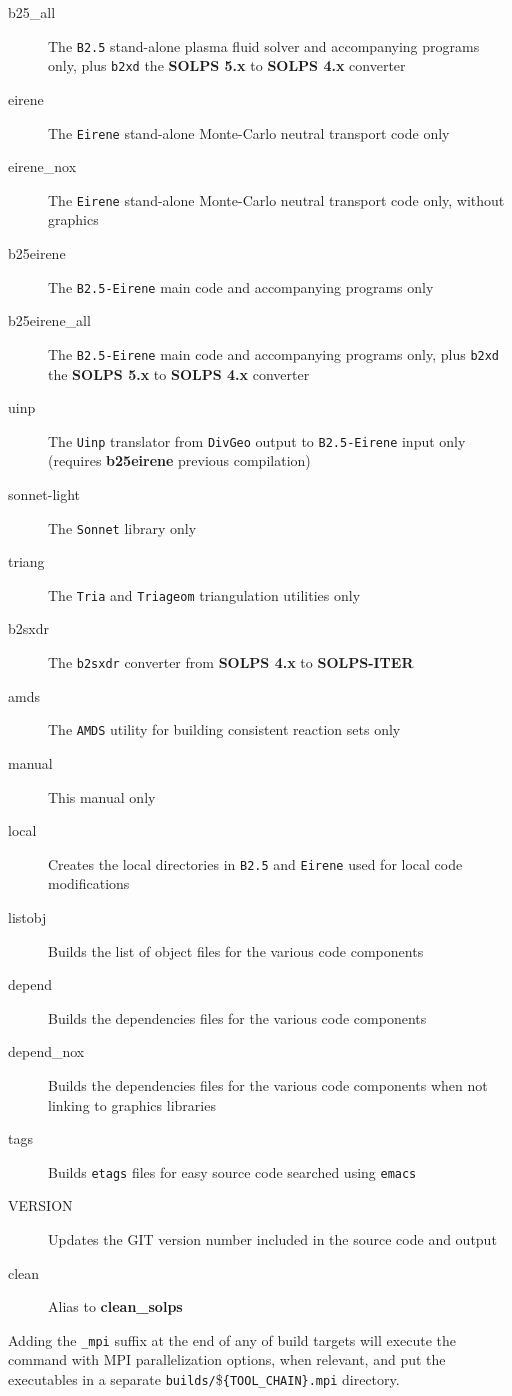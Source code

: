 \documentclass[a4paper,10pt]{report}
\newcommand\SOLPSfour{{\bf SOLPS 4.x} }
\newcommand\SOLPSfive{{\bf SOLPS 5.x} }
\newcommand\SOLPSITER{{\bf SOLPS-ITER} }
\begin{document}
\begin{description}
  \item[b25\_all] The {\tt B2.5} stand-alone plasma fluid solver and accompanying programs only, plus {\tt b2xd} the \SOLPSfive to \SOLPSfour converter
  \item[eirene] The {\tt Eirene} stand-alone Monte-Carlo neutral transport code only
  \item[eirene\_nox] The {\tt Eirene} stand-alone Monte-Carlo neutral transport code only, without graphics
  \item[b25eirene] The {\tt B2.5-Eirene} main code and accompanying programs only
  \item[b25eirene\_all] The {\tt B2.5-Eirene} main code and accompanying programs only, plus {\tt b2xd} the \SOLPSfive to \SOLPSfour converter
  \item[uinp] The {\tt Uinp} translator from {\tt DivGeo} output to {\tt B2.5-Eirene} input only (requires {\bf b25eirene} previous compilation)
  \item[sonnet-light] The {\tt Sonnet} library only
  \item[triang] The {\tt Tria} and {\tt Triageom} triangulation utilities only
  \item[b2sxdr] The {\tt b2sxdr} converter from \SOLPSfour to \SOLPSITER
  \item[amds] The {\tt AMDS} utility for building consistent reaction sets only
  \item[manual] This manual only
  \item[local] Creates the local directories in {\tt B2.5} and {\tt Eirene} used for local code modifications
  \item[listobj] Builds the list of object files for the various code components
  \item[depend] Builds the dependencies files for the various code components
  \item[depend\_nox] Builds the dependencies files for the various code components when not linking to graphics libraries
  \item[tags] Builds {\tt etags} files for easy source code searched using {\tt emacs}
  \item[VERSION] Updates the GIT version number included in the source code and output
  \item[clean] Alias to {\bf clean\_solps}
\end{description}

Adding the {\tt \_mpi} suffix at the end of any of build targets will execute the command
with MPI parallelization options, when relevant, and put the executables in a separate
{\tt builds/}\${\tt \{TOOL\_CHAIN\}.mpi} directory.
\end{document}
